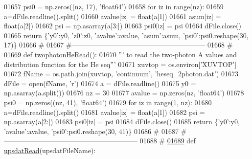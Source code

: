 \begin{DoxyCode}
{{{{{{{{{{{{{{{01657     psi0 = np.zeros((nz, 17), \textcolor{stringliteral}{'float64'})
01658     \textcolor{keywordflow}{for} iz \textcolor{keywordflow}{in} range(nz):
01659         a=dFile.readline().split()
01660         avalue[iz] = float(a[1])
01661         asum[iz] = float(a[2])
01662         psi = np.asarray(a[3:])
01663         psi0[iz] = psi
01664     dFile.close()
01665     \textcolor{keywordflow}{return} \{\textcolor{stringliteral}{'y0'}:y0, \textcolor{stringliteral}{'z0'}:z0, \textcolor{stringliteral}{'avalue'}:avalue, \textcolor{stringliteral}{'asum'}:asum, \textcolor{stringliteral}{'psi0'}:psi0.reshape(30, 17)\}
01666     \textcolor{comment}{#}
01667     \textcolor{comment}{#-----------------------------------------------------------}
01668     \textcolor{comment}{#}
\hypertarget{__chianti__tools_8py_source_l01669}{}\hyperlink{namespacepyneb_1_1utils_1_1__chianti__tools_a79401d478ca07c45f4546a82634e6eb9}{01669} \textcolor{keyword}{def }\hyperlink{namespacepyneb_1_1utils_1_1__chianti__tools_a79401d478ca07c45f4546a82634e6eb9}{twophotonHeRead}():
01670     \textcolor{stringliteral}{''' to read the two-photon A values and distribution function for the He seq'''}
01671     xuvtop = os.environ[\textcolor{stringliteral}{'XUVTOP'}]
01672     fName = os.path.join(xuvtop, \textcolor{stringliteral}{'continuum'}, \textcolor{stringliteral}{'heseq\_2photon.dat'})
01673     dFile = open(fName, \textcolor{stringliteral}{'}\textcolor{stringliteral}{r')}
01674 \textcolor{stringliteral}{    a = dFile.readline()}
01675 \textcolor{stringliteral}{    y0 = np.asarray(a.split())}
01676 \textcolor{stringliteral}{    nz = 30}
01677 \textcolor{stringliteral}{    avalue = np.zeros(nz, }\textcolor{stringliteral}{'float64'})
01678     psi0 = np.zeros((nz, 41), \textcolor{stringliteral}{'float64'})
01679     \textcolor{keywordflow}{for} iz \textcolor{keywordflow}{in} range(1, nz):
01680         a=dFile.readline().split()
01681         avalue[iz] = float(a[1])
01682         psi = np.asarray(a[2:])
01683         psi0[iz] = psi
01684     dFile.close()
01685     \textcolor{keywordflow}{return} \{\textcolor{stringliteral}{'y0'}:y0, \textcolor{stringliteral}{'avalue'}:avalue, \textcolor{stringliteral}{'psi0'}:psi0.reshape(30, 41)\}
01686     \textcolor{comment}{#}
01687     \textcolor{comment}{#-----------------------------------------------------------}
01688     \textcolor{comment}{#}
\hypertarget{__chianti__tools_8py_source_l01689}{}\hyperlink{namespacepyneb_1_1utils_1_1__chianti__tools_a4fab6d9973653d9ca82088006f2a12fe}{01689} \textcolor{keyword}{def }\hyperlink{namespacepyneb_1_1utils_1_1__chianti__tools_a4fab6d9973653d9ca82088006f2a12fe}{upsdatRead}(upsdatFileName):
}}}}}}}}}}}}}}}
\end{DoxyCode}
